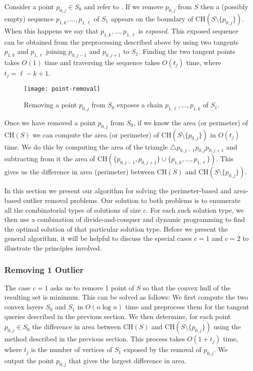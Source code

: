 \documentclass[lotsofwhite]{patmorin}
\newcommand{\ch}{\mathrm{CH}}
\begin{document}
Consider a point $p_{0,j}\in S_0$ and refer to .
If we remove $p_{0,j}$ from $S$ then a (possibly empty) sequence
$p_{1,k},\ldots,p_{1,\ell}$ of $S_1$ appears on the boundary of
$\ch(S\setminus\{p_{0,j}\})$.  When this happens we say that
$p_{1,k},\ldots,p_{1,\ell}$ is \emph{exposed}.  This exposed sequence
can be obtained from the preprocessing described above by using two
tangents $p_{1,k}$ and $p_{1,\ell}$ joining $p_{0,j-1}$ and
$p_{0,j+1}$ to $S_1$.  Finding the two tangent points takes $O(1)$
time and traversing the sequence takes $O(t_j)$ time, where
$t_j=\ell-k+1$.

\begin{figure}
\begin{center}\texttt{[image: point-removal]}\end{center}
\caption{Removing a point $p_{0,j}$ from $S_0$ exposes a chain
$p_{1,\ell},\ldots,p_{1,k}$ of $S_1$.}
\end{figure}

Once we have removed a point $p_{0,j}$ from $S_0$, if we know the area
(or perimeter) of $\ch(S)$ we can compute the area (or perimeter) of
$\ch(S\setminus\{p_{0,j}\})$ in $O(t_j)$ time.  We do this by
computing the area of the triangle $\triangle
p_{0,j-1}p_{0,j}p_{0,j+1}$ and subtracting from it the area of
$\ch(\{p_{0,j-1},p_{0,j+1}\}\cup\{p_{1,k},\ldots,p_{1,\ell}\})$.  This
gives us the difference in area (perimeter) between $\ch(S)$ and
$\ch(S\setminus\{p_{0,j}\})$.

In this section we present our algorithm for solving the
perimeter-based and area-based outlier removal problems. Our solution
to both problems is to enumerate all the combinatorial types of
solutions of size $c$.  For each such solution type, we then use a
combination of divide-and-conquer and dynamic programming to find the
optimal solution of that particular solution type.  Before we present
the general algorithm, it will be helpful to discuss the special cases
$c=1$ and $c=2$ to illustrate the principles involved.

\subsubsection{Removing 1 Outlier}

The case $c=1$ asks us to remove 1 point of $S$ so that the convex
hull of the resulting set is minimum.  This can be solved as follows:
We first compute the two convex layers $S_0$ and $S_1$ in $O(n\log n)$
time and preprocess them for the tangent queries described in the
previous section.  We then determine, for each point $p_{0,j}\in S_0$
the difference in area between $\ch(S)$ and
$\ch(S\setminus\{p_{0,j}\})$ using the method described in the
previous section.  This process takes $O(1+t_j)$ time, where $t_j$ is
the number of vertices of $S_1$ exposed by the removal of $p_{0,j}$.
We output the point $p_{0,j}$ that gives the largest difference in
area.
\end{document}
